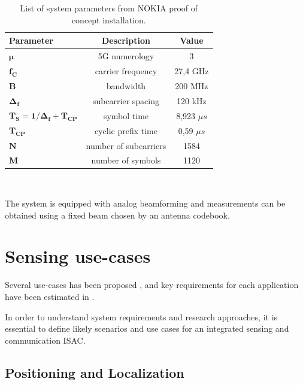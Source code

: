 	\begin{table}[H]
		\centering 
		\begin{tabular}{|p{9em} c c |}
			\hline
			\rowcolor{bluepoli!40} %
			\textbf{Parameter} & \textbf{Description} & \textbf{Value}  \T\B \\
			\hline \hline
			$\bm{\mu}$ & 5G numerology & 3 \T\B \\
			$\bm{f_C}$ & carrier frequency & 27,4 GHz \T\B \\
			$\bm{B}$ & bandwidth & 200 MHz \T\B\\
			$\bm{\Delta_f}$ & subcarrier spacing & 120 kHz  \T\B\\
			$\bm{T_S = 1/\Delta_f + T_{CP}}$ & symbol time & 8,923 $\mu s$  \T\B\\
			$\bm{T_{CP}}$ & cyclic prefix time & 0,59 $\mu s$  \T\B\\
			$\bm{N}$ & number of subcarriers & 1584  \T\B\\
			$\bm{M}$ & number of symbols & 1120  \B\\
			
			\hline
		\end{tabular}
		\\[10pt]
		\caption{List of system parameters from NOKIA proof of concept installation.}
		\label{table:PoCparams}
	\end{table}
	
	The system is equipped with analog beamforming and measurements can be obtained using a fixed beam chosen by an antenna codebook.


\section{Sensing use-cases}

	Several use-cases has been proposed \cite{Mandelli_Henninger_Bauhofer_Wild_2023}, \cite{Wang_Varshney_Gentile_Blandino_Chuang_Golmie_2022} and  key requirements for each application have been estimated in \cite{Wild_Braun_Viswanathan_2021}.
	
	In order to understand system requirements and research approaches, it is essential to define likely scenarios and use cases for an integrated sensing and communication ISAC.
	
	\subsection{Positioning and Localization}
	
